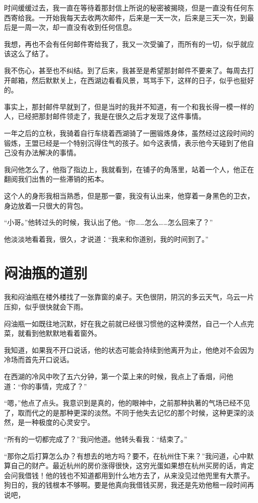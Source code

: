 时间缓缓过去，我一直在等待着那封信上所说的秘密被揭晓，但是一直没有任何东西寄给我。一开始我每天去收两次邮件，后来是一天一次，后来是三天一次，到最后是一周一次，却一直没有收到任何信息。

我想，再也不会有任何邮件寄给我了，我又一次受骗了，而所有的一切，似乎就应该这么了结了。

我不伤心，甚至也不纠结。到了后来，我甚至是希望那封邮件不要来了。每周去打开邮箱，然后默默关上，在西湖边看看风景，骂骂手下，这样的日子，似乎也挺好的。

事实上，那封邮件早就到了，但是当时的我并不知道，有一个和我长得一模一样的人，已经把那封邮件领走了，我是在很久之后才发现了这件事情。

一年之后的立秋，我骑着自行车绕着西湖骑了一圈锻炼身体，虽然经过这段时间的锻炼，王盟已经是一个特别沉得住气的孩子。如今这表情，表示他今天碰到了他自己没有办法解决的事情。

我问他怎么了，他指了指边上，我就看到，在铺子的角落里，站着一个人，他正在翻阅我们出售的一些滞销的拓本。

这个人的身形我相当熟悉，但是那一霎，我没有认出来，他穿着一身黑色的卫衣，身边放着一只很大的背包。

“小哥。”他转过头的时候，我认出了他。“你……怎么……怎么回来了？”

他淡淡地看着我，很久，才说道：“我来和你道别，我的时间到了。”

\chapter{闷油瓶的道别}

我和闷油瓶在楼外楼找了一张靠窗的桌子。天色很阴，阴沉的多云天气，乌云一片压抑，似乎很快就会下雨。

闷油瓶一如既往地沉默，好在我之前就已经很习惯他的这种漠然，自己一个人点完菜，就看到他默默地看着窗外。

我知道，如果我不开口说话，他的状态可能会持续到他离开为止，他绝对不会因为冷场而首先开口说话。

在西湖的冷风中吹了五六分钟，第一个菜上来的时候，我点上了香烟，问他道：“你的事情，完成了？”

“嗯，”他点了点头。我意识到是真的，他的眼神中，之前那种执著的气场已经不见了，取而代之的是那种更深的淡然。不同于他失去记忆的那个时候，这种更深的淡然，是一种极度的心灵安宁。

“所有的一切都完成了？”我问他道。他转头看我：“结束了。”

“那你之后打算怎么办？有想去的地方吗？要不，在杭州住下来？”我问道，心中默算自己的财产。最近杭州的房价涨得很快，这穷光蛋如果想在杭州买房的话，肯定会问我借钱！他的钱也不知道都用到什么地方去了，从来没见过他兜里有大票子。狗日的，我的钱根本不够啊。要是他真向我借钱买房，我还是先劝他租一段时间再说吧，

